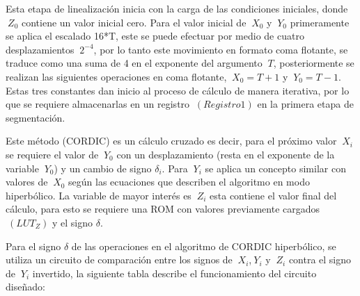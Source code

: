 Esta etapa de linealización inicia con la carga de las condiciones iniciales, donde $\ Z_0 $ contiene un valor inicial cero. Para el valor inicial de $\ X_0 $ y $\ Y_0 $ primeramente se aplica el escalado  16*T, este se puede efectuar por medio de cuatro desplazamientos $\ 2^{-4} $, por lo tanto este movimiento en formato coma flotante, se traduce como una suma de 4 en el exponente del argumento $\ T$, posteriormente se realizan las siguientes operaciones en coma flotante,  $\ X_0 = T + 1 $ y $\ Y_0 = T - 1 $. Estas tres constantes dan inicio al proceso de cálculo de manera iterativa, por lo que se requiere almacenarlas en un registro $\ \left(Registro 1 \right) $ en la primera etapa de segmentación. 

Este método (CORDIC) es un cálculo cruzado es decir, para el próximo valor $\ X_i$ se requiere el valor de $\ Y_0 $ con un desplazamiento (resta en el exponente de la variable $\ Y_0 $)  y un cambio de signo $ \delta_i $. Para $\ Y_i $ se aplica un concepto similar con valores de $\ X_0$ según las ecuaciones que describen el algoritmo en modo hiperbólico. La variable de mayor interés es $\ Z_i $ esta contiene el valor final del cálculo, para esto se requiere una ROM con valores previamente cargados $\ \left(LUT_Z \right) $ y el signo $ \delta $.

Para el signo $ \delta $ de las operaciones en el algoritmo de CORDIC hiperbólico, se utiliza un circuito de comparación entre los signos de $\ X_i$,$\ Y_i$ y $\ Z_i$ contra el signo de $\ Y_i$ invertido, la siguiente tabla describe el funcionamiento del circuito diseñado: 

